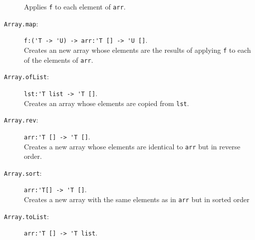 \documentclass[fsharpNotes.tex]{subfiles}
\begin{document}
\begin{description}
  Applies \lstinline{f} to each element of \lstinline{arr}.
\item[\texttt{Array.map}:] \lstinline{f:('T -> 'U) -> arr:'T [] -> 'U []}.~\\
  Creates an new array whose elements are the results of applying \lstinline{f} to each of the elements of \lstinline{arr}.
\item[\texttt{Array.ofList}:] \lstinline{lst:'T list -> 'T []}.~\\
  Creates an array whose elements are copied from \lstinline{lst}.
\item[\texttt{Array.rev}:] \lstinline{arr:'T [] -> 'T []}.~\\
  Creates a new array whose elements are identical to \lstinline{arr} but in reverse order.
\item[\texttt{Array.sort}:] \lstinline{arr:'T[] -> 'T []}.~\\
  Creates a new array with the same elements as in \lstinline{arr} but in sorted order %
\item[\texttt{Array.toList}:] \lstinline{arr:'T [] -> 'T list}.~\\

\end{description}
\end{document}
